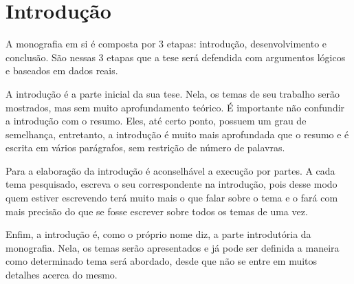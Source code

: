 \chapter*[Introdução]{Introdução}
A monografia em si é composta por 3 etapas: introdução, desenvolvimento e conclusão. São nessas 3 etapas que a tese será defendida com argumentos lógicos e baseados em dados reais.

A introdução é a parte inicial da sua tese. Nela, os temas de seu trabalho serão mostrados, mas sem muito aprofundamento teórico. É importante não confundir a introdução com o resumo. Eles, até certo ponto, possuem um grau de semelhança, entretanto, a introdução é muito mais aprofundada que o resumo e é escrita em vários parágrafos, sem restrição de número de palavras.

Para a elaboração da introdução é aconselhável a execução por partes. A cada tema pesquisado, escreva o seu correspondente na introdução, pois desse modo quem estiver escrevendo terá muito mais o que falar sobre o tema e o fará com mais precisão do que se fosse escrever sobre todos os temas de uma vez.

Enfim, a introdução é, como o próprio nome diz, a parte introdutória da monografia. Nela, os temas serão apresentados e já pode ser definida a maneira como determinado tema será abordado, desde que não se entre em muitos detalhes acerca do mesmo.


